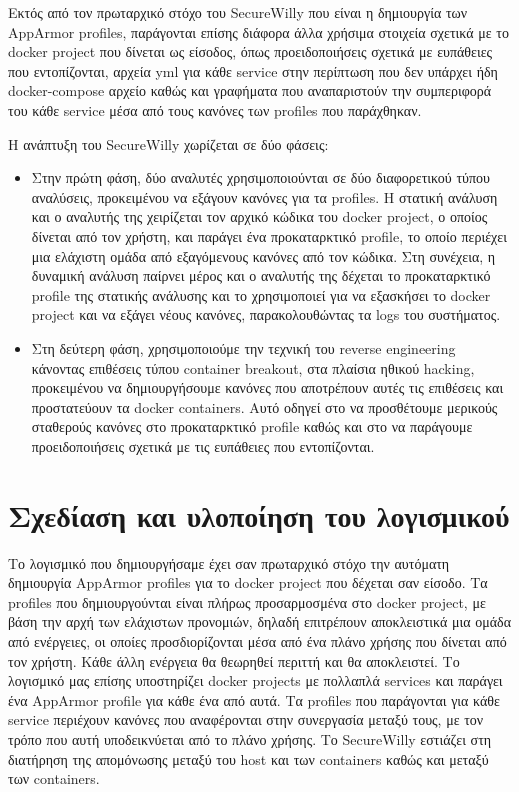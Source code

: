 Εκτός από τον πρωταρχικό στόχο του \en SecureWilly\gr{} που είναι η δημιουργία των \en AppArmor profiles\gr{}, παράγονται επίσης διάφορα άλλα χρήσιμα στοιχεία σχετικά με το \en docker project \gr{} που δίνεται ως είσοδος, όπως προειδοποιήσεις σχετικά με ευπάθειες που εντοπίζονται, αρχεία \en yml\gr{} για κάθε \en service\gr{} στην περίπτωση που δεν υπάρχει ήδη \en docker-compose\gr{} αρχείο καθώς και γραφήματα που αναπαριστούν την συμπεριφορά του κάθε \en service\gr{} μέσα από τους κανόνες των \en profiles\gr{} που παράχθηκαν.

Η ανάπτυξη του \en SecureWilly\gr{} χωρίζεται σε δύο φάσεις:
\begin{itemize}
\item Στην πρώτη φάση, δύο αναλυτές χρησιμοποιούνται σε δύο διαφορετικού τύπου αναλύσεις, προκειμένου να εξάγουν κανόνες για τα \en profiles\gr{}. Η στατική ανάλυση και ο αναλυτής της χειρίζεται τον αρχικό κώδικα του \en docker project\gr{}, ο οποίος δίνεται από τον χρήστη, και παράγει ένα προκαταρκτικό \en profile\gr{}, το οποίο περιέχει μια ελάχιστη ομάδα από εξαγόμενους κανόνες από τον κώδικα. Στη συνέχεια, η δυναμική ανάλυση παίρνει μέρος και ο αναλυτής της δέχεται το προκαταρκτικό \en profile\gr{} της στατικής ανάλυσης και το χρησιμοποιεί για να εξασκήσει το \en docker project\gr{} και να εξάγει νέους κανόνες, παρακολουθώντας τα \en logs\gr{} του συστήματος.

\item Στη δεύτερη φάση, χρησιμοποιούμε την τεχνική του \en reverse engineering\gr{} κάνοντας επιθέσεις τύπου \en container breakout\gr{}, στα πλαίσια ηθικού \en hacking\gr{}, προκειμένου να δημιουργήσουμε κανόνες που αποτρέπουν αυτές τις επιθέσεις και προστατεύουν τα \en docker containers\gr{}. Αυτό οδηγεί στο να προσθέτουμε μερικούς σταθερούς κανόνες στο προκαταρκτικό \en profile \gr{} καθώς και στο να παράγουμε προειδοποιήσεις σχετικά με τις ευπάθειες που εντοπίζονται.
\end{itemize}

\section*{Σχεδίαση και υλοποίηση του λογισμικού}

Το λογισμικό που δημιουργήσαμε έχει σαν πρωταρχικό στόχο την αυτόματη δημιουργία \en AppArmor profiles\gr{} για το \en docker project\gr{} που δέχεται σαν είσοδο. Τα \en profiles\gr{} που δημιουργούνται είναι πλήρως προσαρμοσμένα στο \en docker project\gr{}, με βάση την αρχή των ελάχιστων προνομιών, δηλαδή επιτρέπουν αποκλειστικά μια ομάδα από ενέργειες, οι οποίες προσδιορίζονται μέσα από ένα πλάνο χρήσης που δίνεται από τον χρήστη. Κάθε άλλη ενέργεια θα θεωρηθεί περιττή και θα αποκλειστεί. Το λογισμικό μας επίσης υποστηρίζει \en docker projects\gr{} με πολλαπλά \en services\gr{} και παράγει ένα \en AppArmor profile\gr{} για κάθε ένα από αυτά. Τα \en profiles\gr{} που παράγονται για κάθε \en service\gr{} περιέχουν κανόνες που αναφέρονται στην συνεργασία μεταξύ τους, με τον τρόπο που αυτή υποδεικνύεται από το πλάνο χρήσης. Το \en SecureWilly\gr{} εστιάζει στη διατήρηση της απομόνωσης μεταξύ του \en host\gr{} και των \en containers\gr{} καθώς και μεταξύ των \en containers\gr{}.

